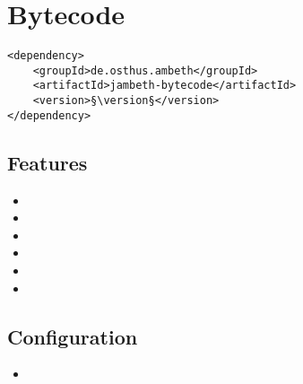 \section{Bytecode}
\label{module:Bytecode}
\ClearAPI
\TODO
\begin{lstlisting}[style=POM,caption={Maven modules to use \emph{Ambeth Bytecode}}]
<dependency>
	<groupId>de.osthus.ambeth</groupId>
	<artifactId>jambeth-bytecode</artifactId>
	<version>§\version§</version>
</dependency>
\end{lstlisting}
\subsection{Features}
\begin{itemize}
	\item {}
	\item {}
	\item {}
	\item {}
	\item {}
	\item {}
\end{itemize}

\subsection{Configuration}
\begin{itemize}
	\item {}
\end{itemize}

